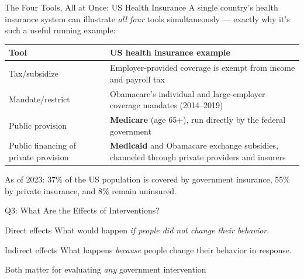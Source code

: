 \documentclass[11pt,aspectratio=169]{beamer}
\begin{document}
\begin{frame}{The Four Tools, All at Once: US Health Insurance}
  \small
  A single country's health insurance system can illustrate \emph{all four} tools simultaneously --- exactly why it's such a useful running example:
  \begin{center}
  \small
  \begin{tabular}{@{}p{3.4cm}p{8.5cm}@{}}
    \toprule
    \textbf{Tool} & \textbf{US health insurance example} \\
    \midrule
    Tax/subsidize & Employer-provided coverage is exempt from income and payroll tax \\[0.3em]
    Mandate/restrict & Obamacare's individual and large-employer coverage mandates (2014--2019) \\[0.3em]
    Public provision & \textbf{Medicare} (age 65+), run directly by the federal government \\[0.3em]
    Public financing of private provision & \textbf{Medicaid} and Obamacare exchange subsidies, channeled through private providers and insurers \\
    \bottomrule
  \end{tabular}
  \end{center}
  \vspace{0.2em}
  As of 2023: 37\% of the US population is covered by government insurance, 55\% by private insurance, and 8\% remain uninsured.
\end{frame}

\begin{frame}{Q3: What Are the Effects of Interventions?}
  \begin{block}{Direct effects}
    What would happen \emph{if people did not change their behavior}.
  \end{block}
  \begin{block}{Indirect effects}
    What happens \emph{because} people change their behavior in response.
  \end{block}
  \vspace{1em}
  \centering
  Both matter for evaluating \emph{any} government intervention
\end{frame}
\end{document}
